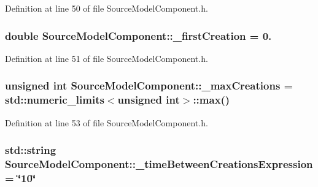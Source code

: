 Definition at line 50 of file Source\-Model\-Component.\-h.

\hypertarget{class_source_model_component_ad58dddde2b6a81d85f261fa8a11243b3}{
\subsubsection[{\-\_\-first\-Creation}]{\setlength{\rightskip}{0pt plus 5cm}double Source\-Model\-Component\-::\-\_\-first\-Creation = 0.\hspace{0.3cm}{\ttfamily [protected]}}}\label{class_source_model_component_ad58dddde2b6a81d85f261fa8a11243b3}


Definition at line 51 of file Source\-Model\-Component.\-h.

\hypertarget{class_source_model_component_a99525d31bdc32efd5bbdcfbbbf115ec5}{
\subsubsection[{\-\_\-max\-Creations}]{\setlength{\rightskip}{0pt plus 5cm}unsigned int Source\-Model\-Component\-::\-\_\-max\-Creations = std\-::numeric\-\_\-limits$<$unsigned int$>$\-::max()\hspace{0.3cm}{\ttfamily [protected]}}}\label{class_source_model_component_a99525d31bdc32efd5bbdcfbbbf115ec5}


Definition at line 53 of file Source\-Model\-Component.\-h.

\hypertarget{class_source_model_component_ab0c96af4d61d8125773fa41cff865211}{
\subsubsection[{\-\_\-time\-Between\-Creations\-Expression}]{\setlength{\rightskip}{0pt plus 5cm}std\-::string Source\-Model\-Component\-::\-\_\-time\-Between\-Creations\-Expression = \char`\"{}10\char`\"{}\hspace{0.3cm}{\ttfamily [protected]}}}\label{class_source_model_component_ab0c96af4d61d8125773fa41cff865211}


